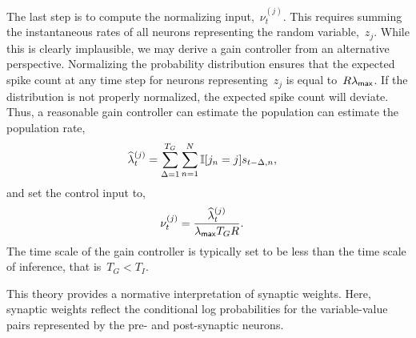 The last step is to compute the normalizing input,~$\nu_t^{(j)}$.
This requires summing the instantaneous rates of all neurons representing the
random variable,~$z_j$. While this is clearly implausible, we may derive
a gain controller from an alternative perspective. Normalizing the
probability distribution ensures that the expected spike count at
any time step for
neurons representing~$z_j$ is equal to~$R\lambda_{\mathsf{max}}$. If the distribution
is not properly normalized, the expected spike count will deviate.
Thus, a reasonable gain controller can estimate the population
can estimate the population rate,
\begin{align}
\widehat{\lambda}_{t}^{(j)} &= \sum_{\Delta = 1}^{T_G} \sum_{n=1}^N \mathbb{I}[j_n=j] s_{t-\Delta, n},
\end{align}
and set the control input to,
\begin{align}
  \nu_{t}^{(j)} &= \frac{\widehat{\lambda}_{t}^{(j)}}{\lambda_{\mathsf{max}} T_G R}.
\end{align}
The time scale of the gain controller is typically set to be
less than the time scale of inference, that is~$T_G < T_I$.


This theory provides a normative interpretation of synaptic weights.
Here, synaptic weights reflect the conditional log probabilities
for the variable-value pairs represented by the pre- and post-synaptic
neurons. 

